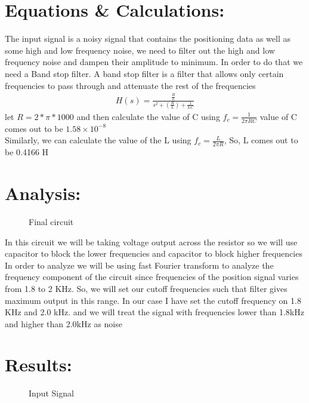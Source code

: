 \documentclass[a4paper,11pt]{article}
\begin{document}
\section{Equations \& Calculations: }
The input signal is a noisy signal that contains the positioning data as well as some high and low frequency noise, we need to filter out the high and low frequency noise and dampen their amplitude to minimum. In order to do that we need a Band stop filter. A band stop filter is a filter that allows only certain frequencies to pass through and attenuate the rest of the frequencies
\begin{align*}
H(s) = \frac{\frac{R}{L}}{s^2+\left(\frac{R}{L}\right)+\frac{1}{LC}}
\end{align*}
let $R = 2*\pi *1000$ and then calculate the value of C using $f_c = \frac{1}{2\pi RC}$ value of C comes out to be $1.58\times 10^{-8} $
\\ Similarly, we can calculate the value of the L using $f_c = \frac{L}{2\pi R}$, So, L comes out to be 0.4166 H


\section{Analysis:}
\begin{figure}[H]
\centering
{}
\label{fig:my_label}
\caption{Final circuit}
\end{figure}
In this circuit we will be taking voltage output across the resistor so we will use capacitor to block the lower frequencies and capacitor to block higher frequencies
\\In order to analyze we will be using fast Fourier transform to analyze the frequency component of the circuit since frequencies of the position signal varies from 1.8 to 2 KHz. So, we will set our cutoff frequencies such that filter gives maximum output in this range.
In our case I have set the cutoff frequency on 1.8 KHz and 2.0 kHz. and we will treat the signal with frequencies lower than 1.8kHz and higher than 2.0kHz as noise 


\section{Results: }

\begin{figure}[H]
\centering
{}
\label{fig:my_label}
\caption{Input Signal}
\end{figure}
\end{document}
